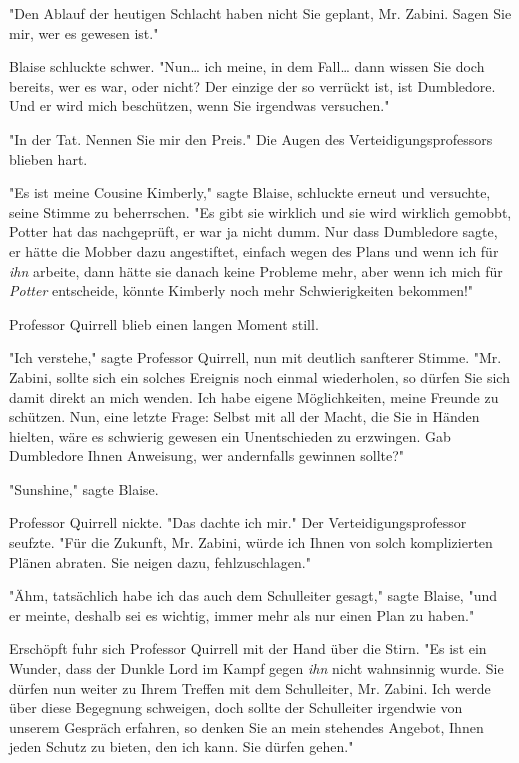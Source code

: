 {"Den Ablauf der heutigen Schlacht haben nicht Sie geplant, Mr. Zabini. Sagen Sie mir, wer es gewesen ist."

Blaise schluckte schwer. "Nun… ich meine, in dem Fall… dann wissen Sie doch bereits, wer es war, oder nicht? Der einzige der so verrückt ist, ist Dumbledore. Und er wird mich beschützen, wenn Sie irgendwas versuchen."

"In der Tat. Nennen Sie mir den Preis." Die Augen des Verteidigungsprofessors blieben hart.

"Es ist meine Cousine Kimberly," sagte Blaise, schluckte erneut und versuchte, seine Stimme zu beherrschen. "Es gibt sie wirklich und sie wird wirklich gemobbt, Potter hat das nachgeprüft, er war ja nicht dumm. Nur dass Dumbledore sagte, er hätte die Mobber dazu angestiftet, einfach wegen des Plans und wenn ich für \emph{ihn} arbeite, dann hätte sie danach keine Probleme mehr, aber wenn ich mich für \emph{Potter} entscheide, könnte Kimberly noch mehr Schwierigkeiten bekommen!"

Professor Quirrell blieb einen langen Moment still.

"Ich verstehe," sagte Professor Quirrell, nun mit deutlich sanfterer Stimme. "Mr. Zabini, sollte sich ein solches Ereignis noch einmal wiederholen, so dürfen Sie sich damit direkt an mich wenden. Ich habe eigene Möglichkeiten, meine Freunde zu schützen. Nun, eine letzte Frage: Selbst mit all der Macht, die Sie in Händen hielten, wäre es schwierig gewesen ein Unentschieden zu erzwingen. Gab Dumbledore Ihnen Anweisung, wer andernfalls gewinnen sollte?"

"Sunshine," sagte Blaise.

Professor Quirrell nickte. "Das dachte ich mir." Der Verteidigungsprofessor seufzte. "Für die Zukunft, Mr. Zabini, würde ich Ihnen von solch komplizierten Plänen abraten. Sie neigen dazu, fehlzuschlagen."

"Ähm, tatsächlich habe ich das auch dem Schulleiter gesagt," sagte Blaise, "und er meinte, deshalb sei es wichtig, immer mehr als nur einen Plan zu haben."

Erschöpft fuhr sich Professor Quirrell mit der Hand über die Stirn. "Es ist ein Wunder, dass der Dunkle Lord im Kampf gegen \emph{ihn} nicht wahnsinnig wurde. Sie dürfen nun weiter zu Ihrem Treffen mit dem Schulleiter, Mr. Zabini. Ich werde über diese Begegnung schweigen, doch sollte der Schulleiter irgendwie von unserem Gespräch erfahren, so denken Sie an mein stehendes Angebot, Ihnen jeden Schutz zu bieten, den ich kann. Sie dürfen gehen."

}

